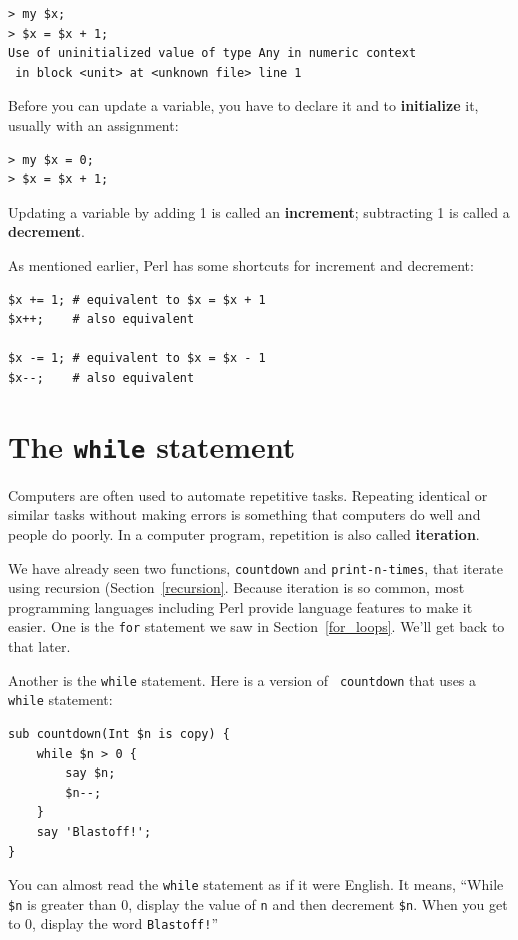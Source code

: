 \begin{verbatim}
> my $x;
> $x = $x + 1;
Use of uninitialized value of type Any in numeric context 
 in block <unit> at <unknown file> line 1
\end{verbatim}
%
Before you can update a variable, you have to declare it and 
to {\bf initialize} it, usually with an assignment:

\begin{verbatim}
> my $x = 0;
> $x = $x + 1;
\end{verbatim}
%
Updating a variable by adding 1 is called an {\bf increment};
subtracting 1 is called a {\bf decrement}.

As mentioned earlier, Perl has some shortcuts for increment and decrement:

\begin{verbatim}
$x += 1; # equivalent to $x = $x + 1
$x++;    # also equivalent 

$x -= 1; # equivalent to $x = $x - 1
$x--;    # also equivalent 
\end{verbatim}

\section{The {\tt while} statement}

Computers are often used to automate repetitive tasks.  Repeating
identical or similar tasks without making errors is something that
computers do well and people do poorly.  In a computer program,
repetition is also called {\bf iteration}.

We have already seen two functions, {\tt countdown} and
\verb"print-n-times", that iterate using recursion 
(Section~\ref{recursion}.  Because 
iteration is so common, most programming languages including 
Perl provide language features to make it easier.
One is the {\tt for} statement we saw in Section~\ref{for_loops}.
We'll get back to that later.

Another is the {\tt while} statement.  Here is a version of {\tt
countdown} that uses a {\tt while} statement:

\begin{verbatim}
sub countdown(Int $n is copy) {
    while $n > 0 {
        say $n;
        $n--;
    }
    say 'Blastoff!';
}
\end{verbatim}
%
You can almost read the {\tt while} statement as if it were English.
It means, ``While {\tt \$n} is greater than 0,
display the value of {\tt n} and then decrement
{\tt \$n}.  When you get to 0, display the word {\tt Blastoff!}''

